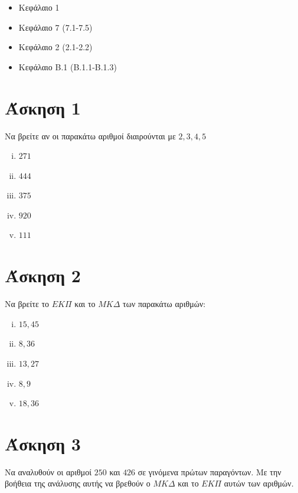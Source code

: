 \documentclass[a4paper,10pt]{report}
\begin{document}
\vspace{2em}
\begin{itemize}
\item Κεφάλαιο 1
\item Κεφάλαιο 7 (7.1-7.5)
\item Κεφάλαιο 2 (2.1-2.2)
\item Κεφάλαιο Β.1 (Β.1.1-Β.1.3)
\end{itemize}


\section*{Άσκηση 1  \hfill \small{}}
Να βρείτε αν οι παρακάτω αριθμοί διαιρούνται με $2,3,4,5$
\begin{enumerate}[i)]
 \item $271$
 \item $444$
 \item $375$
 \item $920$
 \item $111$
\end{enumerate}


\section*{Άσκηση 2  \hfill \small{}}
Να βρείτε το $ΕΚΠ$ και το $ΜΚΔ$  των παρακάτω αριθμών:
\begin{enumerate}[i)]
 \item $15,45$
 \item $8,36$
 \item $13,27$
 \item $8,9$
 \item $18,36$
\end{enumerate}


\section*{Άσκηση 3  \hfill \small{}}
Να αναλυθούν οι αριθμοί $250$ και $426$ σε γινόμενα πρώτων παραγόντων. Με την βοήθεια της ανάλυσης αυτής να βρεθούν 
ο $ΜΚΔ$ και το $ΕΚΠ$ αυτών των αριθμών.
\end{document}
